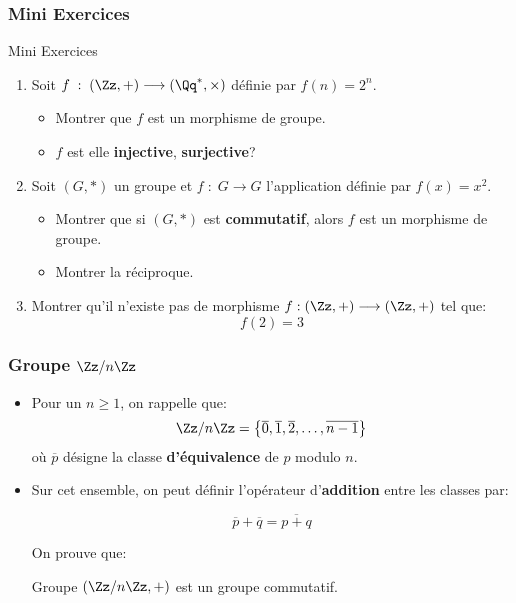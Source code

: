 \documentclass{beamer}
\begin{document}
\begin{frame}[t]
  \frametitle{Mini Exercices}
 \begin{block}{Mini Exercices}
   \small
   \begin{enumerate}
     \small
     \item Soit $f\;:\; \left(\Zz, +\right)\longrightarrow \left(\Qq^{*},
       \times\right)$ définie par $f(n)= 2^n$.
       \begin{itemize}
         \item Montrer que $f$ est un morphisme de groupe.\\[4pt]
         \item $f$ est elle \textbf{injective}, \textbf{surjective}?
       \end{itemize}
       \small
     \item Soit $\left(G, *\right)$ un groupe et $f\;:\; G\longrightarrow G$
       l'application définie par $f(x) = x^2$.
       \begin{itemize}
         \small
         \item Montrer que si $\left(G,*\right)$ est \textbf{commutatif}, alors
           $f$ est un morphisme de groupe.\\[4pt]
         \item Montrer la réciproque.
       \end{itemize}
       \small
     \item Montrer qu'il n'existe pas de morphisme $f:(\Zz, +)\longrightarrow
       (\Zz, +)$ tel que:
       \begin{equation*}
         f(2) = 3
       \end{equation*}
   \end{enumerate}
 \end{block} 
\end{frame}
\begin{frame}[t]
  \frametitle{Groupe $\Zz/ n\Zz$ }
  \begin{itemize}
    \small
    \item Pour un $n\geq 1$, on rappelle que:
      \begin{equation*}
        \Zz/ n\Zz = \left\{ \overline{0}, \overline{1}, \overline{2}, \ldots, \overline{n-1}\right\}
      \end{equation*}
    où $\overline{p}$ désigne la classe \alert{\textbf{d'équivalence}} de $p$
    modulo $n$.
  \item Sur cet ensemble, on peut définir l'opérateur d'\alert{\textbf{addition}} entre les
    classes par:

    \begin{equation}
      \overline{p} + \overline{q} = \overline{p + q}
    \end{equation}

    On prouve que:

    \begin{block}{Groupe}
      $\left(\Zz/n\Zz, +\right)$ est un groupe commutatif.
    \end{block}
  \end{itemize} 
\end{frame}
\end{document}

